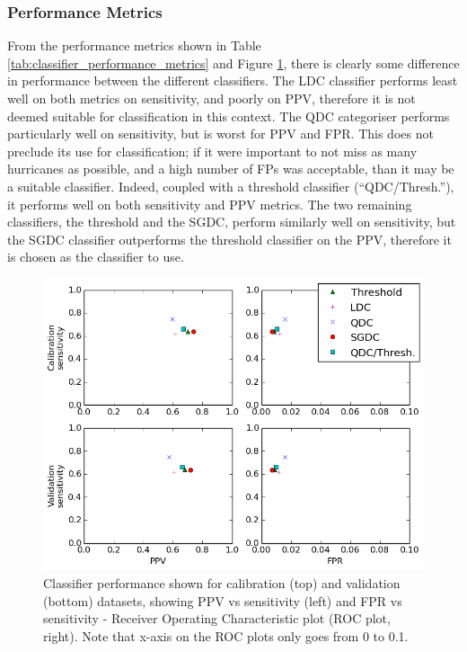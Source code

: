 \documentclass[pdftex,12pt,a4paper]{report}
\begin{document}
\subsubsection{Performance Metrics}

From the performance metrics shown in Table \ref{tab:classifier_performance_metrics} and Figure
\ref{fig:ppv_and_fpr_vs_sens}, there is clearly some difference in performance between the different
classifiers. The LDC classifier performs least well on both metrics on sensitivity, and poorly on
PPV, therefore it is not deemed suitable for classification in this context. The QDC categoriser
performs particularly well on sensitivity, but is worst for PPV and FPR. This does not preclude its
use for classification; if it were important to not miss as many hurricanes as possible, and a high
number of FPs was acceptable, than it may be a suitable classifier. Indeed, coupled with a threshold
classifier (``QDC/Thresh.''), it performs well on both sensitivity and PPV metrics. The two
remaining classifiers, the threshold and the SGDC, perform similarly well on sensitivity, but
the SGDC classifier outperforms the threshold classifier on the PPV, therefore it is chosen as the
classifier to use.

\begin{figure}[hb!]
    \centering
    \includegraphics[width=\textwidth]{figures/ppv_and_fpr_vs_sens}
    \caption{Classifier performance shown for calibration (top) and validation (bottom) datasets,
        showing PPV vs sensitivity (left) and FPR vs sensitivity - Receiver Operating Characteristic
        plot (ROC plot, right). Note that x-axis on the ROC plots only goes from 0 to 0.1. }
    \label{fig:ppv_and_fpr_vs_sens}
\end{figure}
\end{document}
